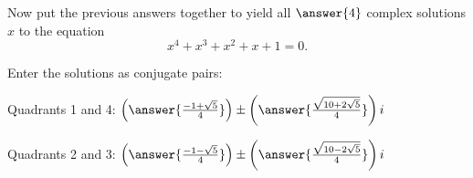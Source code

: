 \documentclass[space,nooutcomes]{ximera}
\begin{document}
\begin{problem}
Now put the previous answers together to yield all $\answer{4}$ complex solutions $x$ to the equation
\[
x^4+x^3+x^2+x+1=0.
\]

Enter the solutions as conjugate pairs: 

Quadrants 1 and 4: $\left(\answer{\frac{-1+\sqrt{5}}{4}}\right) 
     \pm \left(\answer{\frac{\sqrt{10+2\sqrt{5}}}{4}}\right)i$

Quadrants 2 and 3: $\left(\answer{\frac{-1-\sqrt{5}}{4}}\right)
     \pm \left(\answer{\frac{\sqrt{10-2\sqrt{5}}}{4}}\right)i$ 



\end{problem}
\end{document}
